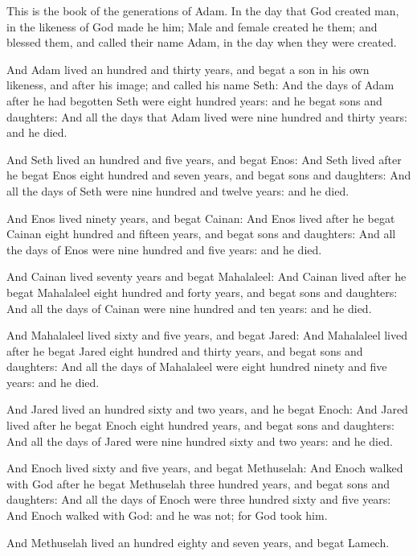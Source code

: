 \verse This is the book of the generations of Adam. In the day that God
created man, in the likeness of God made he him; \verse Male and female
created he them; and blessed them, and called their name Adam, in the
day when they were created.

\verse And Adam lived an hundred and thirty years, and begat a son in his
own likeness, and after his image; and called his name Seth: \verse And
the days of Adam after he had begotten Seth were eight hundred years:
and he begat sons and daughters: \verse And all the days that Adam lived
were nine hundred and thirty years: and he died.

\verse And Seth lived an hundred and five years, and begat Enos: \verse And
Seth lived after he begat Enos eight hundred and seven years, and
begat sons and daughters: \verse And all the days of Seth were nine
hundred and twelve years: and he died.

\verse And Enos lived ninety years, and begat Cainan: \verse And Enos lived
after he begat Cainan eight hundred and fifteen years, and begat sons
and daughters: \verse And all the days of Enos were nine hundred and
five years: and he died.

\verse And Cainan lived seventy years and begat Mahalaleel: \verse And
Cainan lived after he begat Mahalaleel eight hundred and forty years,
and begat sons and daughters: \verse And all the days of Cainan were
nine hundred and ten years: and he died.

\verse And Mahalaleel lived sixty and five years, and begat Jared: \verse
And Mahalaleel lived after he begat Jared eight hundred and thirty
years, and begat sons and daughters: \verse And all the days of
Mahalaleel were eight hundred ninety and five years: and he died.

\verse And Jared lived an hundred sixty and two years, and he begat
Enoch: \verse And Jared lived after he begat Enoch eight hundred years,
and begat sons and daughters: \verse And all the days of Jared were nine
hundred sixty and two years: and he died.

\verse And Enoch lived sixty and five years, and begat Methuselah: \verse
And Enoch walked with God after he begat Methuselah three hundred
years, and begat sons and daughters: \verse And all the days of Enoch
were three hundred sixty and five years: \verse And Enoch walked with
God: and he was not; for God took him.

\verse And Methuselah lived an hundred eighty and seven years, and begat
Lamech.


